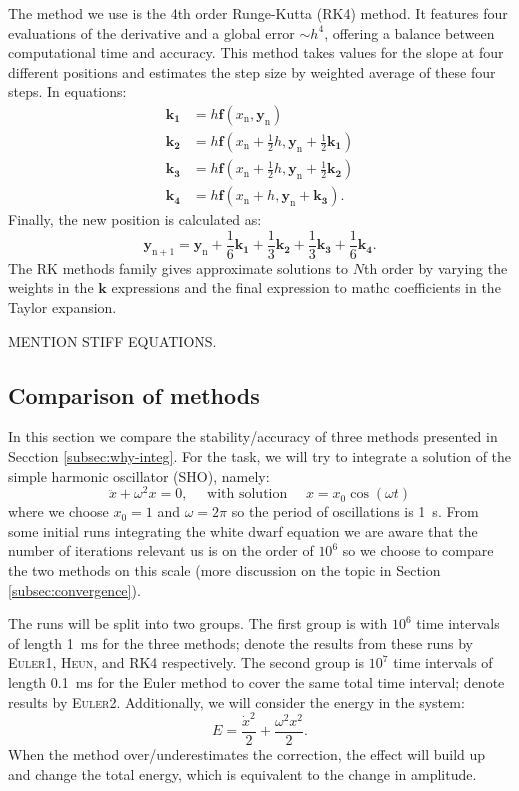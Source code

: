 \documentclass[]{article}
\renewcommand{\vec}[1]{\boldsymbol{#1}}
\newcommand{\eulerOne}{\textsc{Euler1}}
\newcommand{\eulerTwo}{\textsc{Euler2}}
\newcommand{\heun}{\textsc{Heun}}
\newcommand{\rkFour}{\textsc{RK4}}
\begin{document}
	The method we use is the 4th order Runge-Kutta (RK4) method. It features four evaluations of the derivative and a global error $\sim h^4$, offering a balance between computational time and accuracy. This method takes values for the slope at four different positions and estimates the step size by weighted average of these four steps. In equations:
	\begin{align*}
		\vec{k_1} &= h \vec{f}(x_\mathrm{n}, \vec{y}_\mathrm{n})\\
		\vec{k_2} &= h \vec{f}\left(x_\mathrm{n} + \frac{1}{2} h, \vec{y}_\mathrm{n} + \frac{1}{2}\vec{k_1}\right)\\
		\vec{k_3} &= h \vec{f}\left(x_\mathrm{n} + \frac{1}{2} h, \vec{y}_\mathrm{n} + \frac{1}{2}\vec{k_2}\right)\\
		\vec{k_4} &= h \vec{f}(x_\mathrm{n} + h, \vec{y}_\mathrm{n} + \vec{k_3}).
	\end{align*}
	Finally, the new position is calculated as:
	\begin{equation}
		\vec{y}_\mathrm{n+1} = \vec{y}_\mathrm{n} + \frac{1}{6} \vec{k_1} + \frac{1}{3} \vec{k_2} + \frac{1}{3} \vec{k_3} + \frac{1}{6} \vec{k_4}.
	\end{equation}
	The RK methods family gives approximate solutions to $N$th order by varying the weights in the $\vec{k}$ expressions and the final expression to mathc coefficients in the Taylor expansion.

	{\color{red} MENTION STIFF EQUATIONS.}

\subsection{Comparison of methods}
	In this section we compare the stability/accuracy of three methods presented in Secction \ref{subsec:why-integ}. For the task, we will try to integrate a solution of the simple harmonic oscillator (SHO), namely:
	\begin{equation}
		\ddot{x} + \omega^2 x = 0, \quad \text{ with solution } \quad x = x_0 \cos(\omega t)
	\end{equation}
	where we choose $x_0 = 1$ and $\omega = 2 \pi$ so the period of oscillations is \SI{1}{s}. From some initial runs integrating the white  dwarf equation we are aware that the number of iterations relevant us is on the order of $10^{6}$ so we choose to compare the two methods on this scale (more discussion on the topic in Section \ref{subsec:convergence}).

	The runs will be split into two groups. The first group is with $10^6$ time intervals of length \SI{1}{ms} for the three methods; denote the results from these runs by \eulerOne{}, \heun{}, and \rkFour{} respectively. The second group is $10^7$ time intervals of length \SI{0.1}{ms} for the Euler method to cover the same total time interval; denote results by \eulerTwo{}. Additionally, we will consider the energy in the system:
	\begin{equation}
		E = \frac{\dot{x}^2}{2} + \frac{\omega^2 x^2}{2}.
	\end{equation}
	When the method over/underestimates the correction, the effect will build up and change the total energy, which is equivalent to the change in amplitude.
\end{document}
